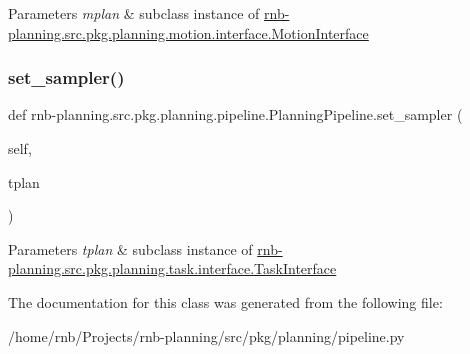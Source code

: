 \begin{DoxyParams}{Parameters}
{\em mplan} & subclass instance of \hyperlink{classrnb-planning_1_1src_1_1pkg_1_1planning_1_1motion_1_1interface_1_1_motion_interface}{rnb-\/planning.\+src.\+pkg.\+planning.\+motion.\+interface.\+Motion\+Interface} \\
\hline
\end{DoxyParams}
\mbox{\label{classrnb-planning_1_1src_1_1pkg_1_1planning_1_1pipeline_1_1_planning_pipeline_a054a0d7395e4b63071c5dc751895d32f}} 
\subsubsection{\texorpdfstring{set\+\_\+sampler()}{set\_sampler()}}
{\footnotesize\ttfamily def rnb-\/planning.\+src.\+pkg.\+planning.\+pipeline.\+Planning\+Pipeline.\+set\+\_\+sampler (\begin{DoxyParamCaption}\item[{}]{self,  }\item[{}]{tplan }\end{DoxyParamCaption})}


\begin{DoxyParams}{Parameters}
{\em tplan} & subclass instance of \hyperlink{classrnb-planning_1_1src_1_1pkg_1_1planning_1_1task_1_1interface_1_1_task_interface}{rnb-\/planning.\+src.\+pkg.\+planning.\+task.\+interface.\+Task\+Interface} \\
\hline
\end{DoxyParams}


The documentation for this class was generated from the following file\+:\begin{DoxyCompactItemize}
\item 
/home/rnb/\+Projects/rnb-\/planning/src/pkg/planning/pipeline.\+py\end{DoxyCompactItemize}
